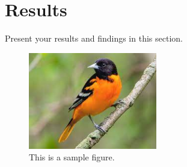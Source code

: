 \section{Results}
Present your results and findings in this section.

\begin{figure}[h]
    \centering
    \includegraphics[width=0.5\textwidth]{image_old.jpeg}
    \caption{This is a sample figure.}
    \label{fig:sample}
\end{figure}